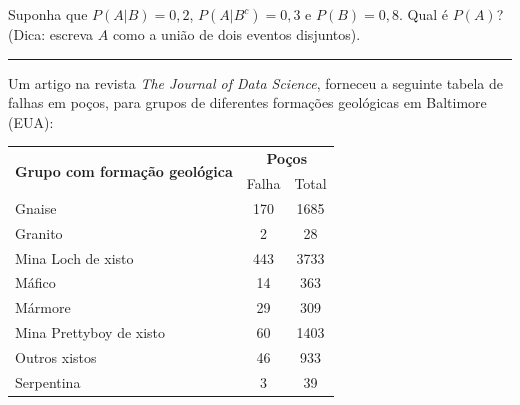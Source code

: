 \documentclass[a4paper,11pt,fleqn]{article}\usepackage[]{graphicx}\usepackage[]{color}
\theoremstyle{definition}
\begin{document}
\begin{compactenum}
\item Suponha que $P(A|B) = 0,2$, $P(A|B^c) = 0,3$ e $P(B) = 0,8$. Qual
  é $P(A)$? (Dica: escreva $A$ como a união de dois eventos disjuntos).

\vspace{0.3cm}
\hrule
\vspace{0.3cm}


\item Um artigo na revista \textit{The Journal of Data Science},
  forneceu a seguinte tabela de falhas em poços, para grupos de
  diferentes formações geológicas em Baltimore (EUA):
  \begin{table}[!h]
    \centering
    \begin{tabular}{lcc}
      \hline
      \multirow{2}{*}{\textbf{Grupo com formação geológica}}
      & \multicolumn{2}{c}{\textbf{Poços}} \\
      \cline{2-3}
                & Falha      & Total  \\
      \hline
      Gnaise     & 170           & 1685           \\
      Granito    & 2           & 28           \\
      Mina Loch de xisto    & 443           & 3733   \\
      Máfico & 14 & 363 \\
      Mármore & 29 & 309 \\
      Mina Prettyboy de xisto & 60 & 1403 \\
      Outros xistos & 46 & 933 \\
      Serpentina & 3 & 39 \\
      \hline
    \end{tabular}
  \end{table}


\end{compactenum}
\end{document}
